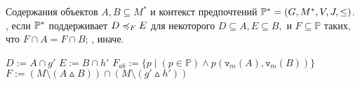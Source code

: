 \begin{algorithm}
	\caption{$(A, B, \PP^*)$ \cite[Алг.~1]{Obiedkov:2013}}
	\label{algo:prediction_multi}
	\begin{algorithmic}[1]
		\REQUIRE Содержания объектов $A, B \subseteq M^*$ и контекст предпочтений $\mathbb{P}^* = (G, M^*, V, J, \leq)$.
		\ENSURE \TRUE, если $\mathbb{P}^*$ поддерживает $D \preccurlyeq_{F} E$ для некоторого $D \subseteq A, E \subseteq B,$ и $F \subseteq \mathbb{P}$ таких, что $F \cap A = F \cap B$; \FALSE, иначе.
		\item[]
		\STATE $D := A \cap g'$
		\STATE $E := B \cap h'$
		\STATE $F_{ab} := \{p\;|\;(p \in \mathbb{P}) \wedge p(\mathtt{v}_m(A), \mathtt{v}_m(B))\}$
		\STATE $F := (M \setminus (A \vartriangle B)) \cap (M \setminus (g' \vartriangle h'))$
		\IF{$\PP \models \DEF$}
		\RETURN \TRUE
		\ENDIF
		\ENDFOR
		\ENDFOR
		\RETURN \FALSE
	\end{algorithmic}
\end{algorithm}
